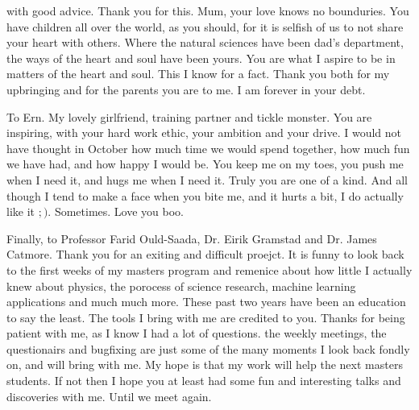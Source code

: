 with good advice. Thank you for this. Mum, your love knows no bounduries. You have children all over the world, as you should, 
for it is selfish of us to not share your heart with others. Where the natural sciences have been dad's department, the ways 
of the heart and soul have been yours. You are what I aspire to be in matters of the heart and soul. This I know for a fact. 
Thank you both for my upbringing and for the parents you are to me. I am forever in your debt. \par 
To Ern. My lovely girlfriend, training partner and tickle monster. You are inspiring, with your hard work ethic, your ambition 
and your drive. I would not have thought in October how much time we would spend together, how much fun we have had, and how happy 
I would be. You keep me on my toes, you push me when I need it, and hugs me when I need it. Truly you are one of a kind. 
And all though I tend to make a face when you bite me, and it hurts a bit, I do actually like it $;)$. Sometimes. Love you boo.\par
Finally, to Professor Farid Ould-Saada, Dr. Eirik Gramstad and Dr. James Catmore. Thank you for an exiting and difficult proejct. 
It is funny to look back to the first weeks of my masters program and remenice about how little I actually knew about physics, 
the porocess of science research, machine learning applications and much much more. These past two years have been an education 
to say the least. The tools I bring with me are credited to you. Thanks for being patient with me, as I know I had a lot of questions. 
the weekly meetings, the questionairs and bugfixing are just some of the many moments I look back fondly on, and will bring with me. 
My hope is that my work will help the next masters students. If not then I hope you at least had some fun and interesting talks 
and discoveries with me. Until we meet again. 
